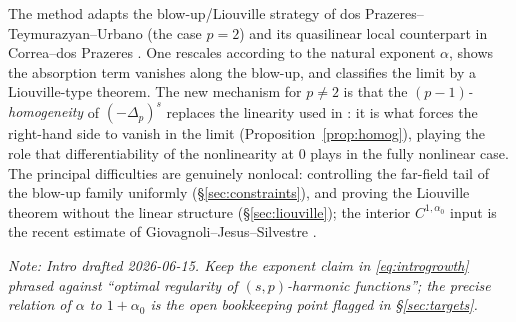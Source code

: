 \documentclass[11pt]{amsart}
\theoremstyle{plain}
\theoremstyle{definition}
\theoremstyle{remark}
\newcommand{\fpl}[1]{(-\Delta_p)^{s}#1}            %
\newcommand{\al}{\alpha}
\newcommand{\NOTE}[1]{\textcolor{blue!70!black}{\textit{Note: #1}}}
\begin{document}
The method adapts the blow-up/Liouville strategy of dos
Prazeres--Teymurazyan--Urbano \cite{PTU} (the case $p=2$) and its
quasilinear local counterpart in Correa--dos Prazeres \cite{CP}. One
rescales according to the natural exponent $\al$, shows the absorption term
vanishes along the blow-up, and classifies the limit by a Liouville-type
theorem. The new mechanism for $p\neq2$ is that the \emph{$(p-1)$-homogeneity}
of $\fpl{}$ replaces the linearity used in \cite{PTU}: it is what forces the
right-hand side to vanish in the limit (Proposition~\ref{prop:homog}),
playing the role that differentiability of the nonlinearity at $0$ plays in
the fully nonlinear case. The principal difficulties are genuinely
nonlocal: controlling the far-field tail of the blow-up family uniformly
(\S\ref{sec:constraints}), and proving the Liouville theorem without the
linear structure (\S\ref{sec:liouville}); the interior $C^{1,\al_0}$ input
is the recent estimate of Giovagnoli--Jesus--Silvestre \cite{GJS}.

\NOTE{Intro drafted 2026-06-15. Keep the exponent claim in
\eqref{eq:introgrowth} phrased against ``optimal regularity of
$(s,p)$-harmonic functions''; the precise relation of $\al$ to $1+\al_0$
is the open bookkeeping point flagged in \S\ref{sec:targets}.}
\end{document}
